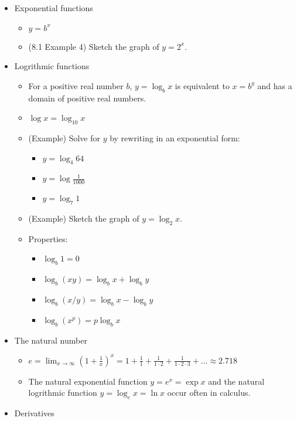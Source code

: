 \documentclass[11pt]{article}
\begin{document}
\begin{itemize}
\item Exponential functions
  \begin{itemize}
    \item \(y=b^x\)
    \item (8.1 Example 4) Sketch the graph of \(y=2^x\).
  \end{itemize}
\item Logrithmic functions
  \begin{itemize}
    \item For a positive real number \(b\),
      \(y=\log_b x\) is equivalent to \(x=b^y\) and has a domain of
      positive real numbers.
    \item \(\log x = \log_{10} x\)
    \item (Example) Solve for \(y\) by rewriting in an exponential form:
      \begin{itemize}
        \item \(y=\log_4 64\)
        \item \(y=\log \frac{1}{1000}\)
        \item \(y=\log_7 1\)
      \end{itemize}
    \item (Example) Sketch the graph of \(y=\log_2 x\).
    \item Properties:
      \begin{itemize}
        \item \(\log_b 1=0\)
        \item \(\log_b(xy)=\log_b x+\log_b y\)
        \item \(\log_b(x/y)=\log_b x-\log_b y\)
        \item \(\log_b(x^p)=p\log_b x\)
      \end{itemize}
  \end{itemize}
\item The natural number
  \begin{itemize}
    \item \(
      e
        =
      \lim_{x\to\infty}(1+\frac{1}{x})^x
        =
      1+\frac{1}{1}+\frac{1}{1\cdot2}+\frac{1}{1\cdot2\cdot3}+\dots
        \approx
      2.718
    \)
    \item The natural exponential function \(y=e^x=\exp x\)
      and the natural logrithmic function \(y=\log_e x=\ln x\) occur often
      in calculus.
  \end{itemize}
\item Derivatives
  \begin{itemize}

\end{itemize}
\end{itemize}
\end{document}
